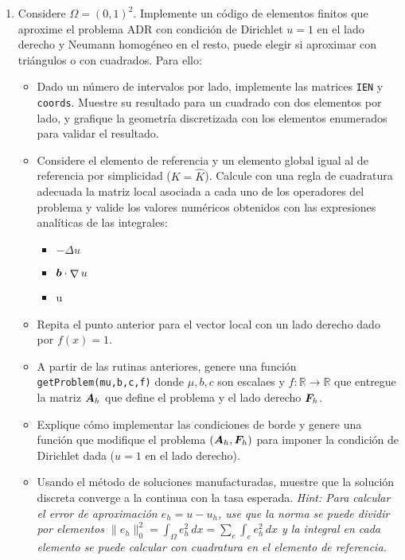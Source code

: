 \documentclass{article}
\renewcommand{\vec}{\vectorsym}
\newcommand{\mat}{\matrixsym}
\DeclareMathOperator{\grad}{\nabla}
\newcommand{\R}{\mathbb{R}}
\newcommand{\pts}[1]{[{\bf #1 puntos}] }
\begin{document}
\begin{enumerate}
    \item Considere $\Omega = (0,1)^2$. Implemente un código de elementos finitos que aproxime el problema ADR con condición de Dirichlet $u=1$ en el lado derecho y Neumann homogéneo en el resto, puede elegir si aproximar con triángulos o con cuadrados. Para ello: 
            \begin{itemize}
                \item\pts{1} Dado un número de intervalos por lado, implemente las matrices \texttt{IEN} y \texttt{coords}. Muestre su resultado para un cuadrado con dos elementos por lado, y grafique la geometría discretizada con los elementos enumerados para validar el resultado.
                \item\pts{3} Considere el elemento de referencia y un elemento global igual al de referencia por simplicidad ($K = \hat K$). Calcule con una regla de cuadratura adecuada la matriz local asociada a cada uno de los operadores del problema y valide los valores numéricos obtenidos con las expresiones analíticas de las integrales: 
                    \begin{itemize}
                        \item $-\Delta u$
                        \item $\vec b \cdot \grad u$
                        \item u
                    \end{itemize}
                \item\pts{2} Repita el punto anterior para el vector local con un lado derecho dado por $f(x) = 1$. 
                \item\pts{3} A partir de las rutinas anteriores, genere una función \texttt{getProblem(mu,b,c,f)} donde $\mu,b,c$ son escalaes y $f:\R\to\R$ que entregue la matriz $\mat A_h$ que define el problema y el lado derecho $\vec F_h$.
                \item\pts{2} Explique cómo implementar las condiciones de borde y genere una función que modifique el problema $(\mat A_h, \vec F_h)$ para imponer la condición de Dirichlet dada ($u=1$ en el lado derecho).
                \item\pts{3} Usando el método de soluciones manufacturadas, muestre que la solución discreta converge a la continua con la tasa esperada. \emph{Hint: Para calcular el error de aproximación $e_h = u - u_h$, use que la norma se puede dividir por elementos $\|e_h\|_0^2 = \int_\Omega e_h^2\,dx = \sum_e \int_e e_h^2\,dx$ y la integral en cada elemento se puede calcular con cuadratura en el elemento de referencia.}
            \end{itemize}
\end{enumerate}

\end{document}
